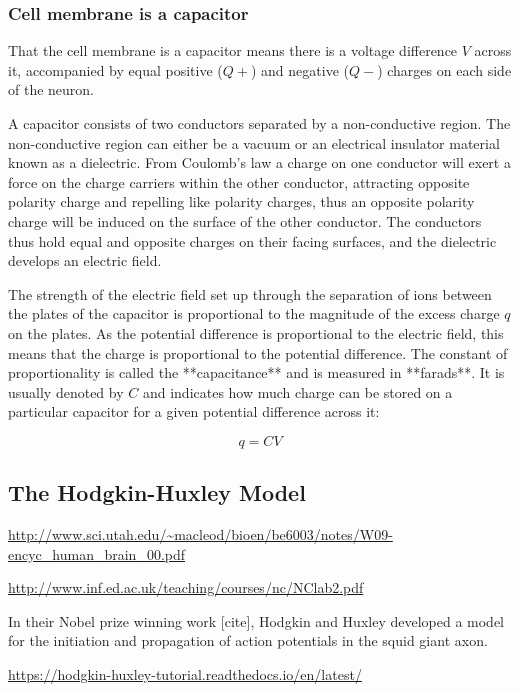 \subsubsection{Cell membrane is a capacitor} 

That the cell membrane is a capacitor means there is a voltage difference $V$ across it, accompanied by equal positive ($Q+$) and negative ($Q-$) charges on each side of the neuron. 

A capacitor consists of two conductors separated by a non-conductive region. The non-conductive region can either be a vacuum or an electrical insulator material known as a dielectric. From Coulomb's law a charge on one conductor will exert a force on the charge carriers within the other conductor, attracting opposite polarity charge and repelling like polarity charges, thus an opposite polarity charge will be induced on the surface of the other conductor. The conductors thus hold equal and opposite charges on their facing surfaces, and the dielectric develops an electric field.

The strength of the electric field set up through the separation of ions between the plates of the capacitor is proportional to the magnitude of the excess charge $q$ on the plates. As the potential difference is proportional to the electric field, this means that the charge is proportional to the potential difference. The constant of proportionality is called the **capacitance** and is measured in **farads**. It is usually denoted by $C$ and indicates how much charge can be stored on a particular capacitor for a given potential difference across it:

$$ q = C V $$


\subsection{The Hodgkin-Huxley Model}\label{sec:hh}

\url{http://www.sci.utah.edu/~macleod/bioen/be6003/notes/W09-encyc_human_brain_00.pdf}

\url{http://www.inf.ed.ac.uk/teaching/courses/nc/NClab2.pdf}

In their Nobel prize winning work [cite], Hodgkin and Huxley developed a model for the initiation and propagation of action potentials in the squid giant axon. 

\url{https://hodgkin-huxley-tutorial.readthedocs.io/en/latest/}

